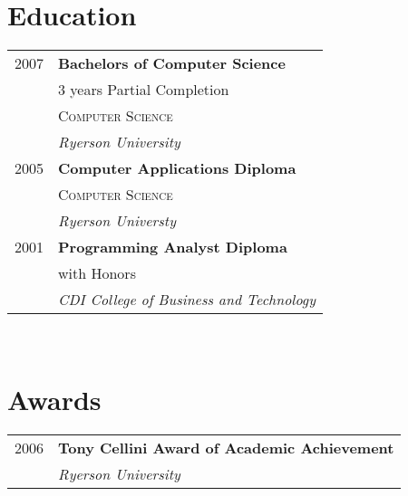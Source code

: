 \documentclass[9pt]{article} %
\begin{document}
{\begin{minipage}[t]{0.44\textwidth}

\section{Education} 

\begin{tabular}{rl} %

2007 & \textbf{Bachelors of Computer Science} \\ 
& \small 3 years Partial Completion \\
& \textsc{Computer Science} \\ 
& \textit{Ryerson University}\\
2005 & \textbf{Computer Applications Diploma}\\
& \textsc{Computer Science} \\
& \textit{Ryerson Universty}\\ 
2001 & \textbf{Programming Analyst Diploma}\\
& \small with Honors \\
& \textit{CDI College of Business and Technology}\\

\end{tabular}\\[10pt]


\section{Awards} 

\begin{tabular}{rl}
2006	 & \textbf{Tony Cellini Award of Academic Achievement}\\
& \textit{Ryerson University}\\
\end{tabular}\\[10pt]


\end{minipage}}
\end{document}
